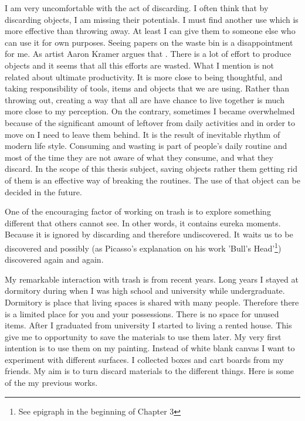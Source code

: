 I am very uncomfortable with the act of discarding. I often think that by discarding objects, I am missing their potentials. I must find another use which is more effective than throwing away. At least I can give them to someone else who can use it for own purposes. Seeing papers on the waste bin is a disappointment for me. As artist Aaron Kramer argues that  \citep[as cited in][]{meyer2007turning}. There is a lot of effort to produce objects and it seems that all this efforts are wasted. What I mention is not related about ultimate productivity. It is more close to being thoughtful, and taking responsibility of tools, items and objects that we are using. Rather than throwing out, creating a way that all are have chance to live together is much more close to my perception. On the contrary, sometimes I became overwhelmed because of the significant amount of leftover from daily activities and in order to move on I need to leave them behind. It is the result of inevitable rhythm of modern life style. Consuming and wasting is part of people's daily routine and most of the time they are not aware of what they consume, and what they discard. In the scope of this thesis subject, saving objects rather them getting rid of them is an effective way of breaking the routines. The use of that object can be decided in the future. 

One of the encouraging factor of working on trash is to explore something different that others cannot see. In other words, it contains eureka moments. Because it is ignored by discarding and therefore undiscovered. It waits us to be discovered and possibly (as Picasso's explanation on his work 'Bull's Head'\footnote{See epigraph in the beginning of Chapter 3}) discovered again and again. 

My remarkable interaction with trash is from recent years. Long years I stayed at dormitory during when I was high school and university while undergraduate. Dormitory is place that living spaces is shared with many people. Therefore there is a limited place for you and your possessions. There is no space for unused items. After I graduated from university I started to living a rented house. This give me to opportunity to save the materials to use them later. My very first intention is to use them on my painting. Instead of white blank canvas I want to experiment with different surfaces. I collected boxes and cart boards from my friends. My aim is to turn discard materials to the different things. Here is some of the my previous works.

